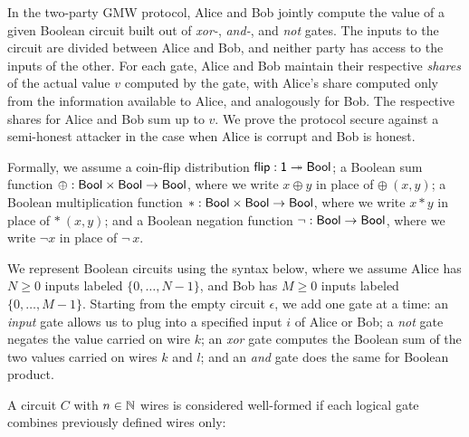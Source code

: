 In the two-party GMW protocol, Alice and Bob jointly compute the value of a given Boolean circuit built out of \emph{xor-}, \emph{and-}, and \emph{not} gates. The inputs to the circuit are divided between Alice and Bob, and neither party has access to the inputs of the other. For each gate, Alice and Bob maintain their respective \emph{shares} of the actual value $v$ computed by the gate, with Alice's share computed only from the information available to Alice, and analogously for Bob. The respective shares for Alice and Bob sum up to $v$. We prove the protocol secure against a semi-honest attacker in the case when Alice is corrupt and Bob is honest.

Formally, we assume a coin-flip distribution $\mathsf{flip} : \mathsf{1} \twoheadrightarrow \mathsf{Bool}$; a Boolean sum function $\oplus : \mathsf{Bool} \times \mathsf{Bool} \rightarrow \mathsf{Bool}$, where we write $x \oplus y$ in place of $\oplus \ (x,y)$; a Boolean multiplication function $* : \mathsf{Bool} \times \mathsf{Bool} \rightarrow \mathsf{Bool}$, where we write $x * y$ in place of $* \ (x,y)$; and a Boolean negation function $\neg : \mathsf{Bool} \rightarrow \mathsf{Bool}$, where we write $\neg x$ in place of $\neg \ x$.

We represent Boolean circuits using the syntax below, where we assume Alice has $N \geq 0$ inputs labeled $\{0,\ldots,N-1\}$, and Bob has $M \geq 0$ inputs labeled $\{0,\ldots,M-1\}$. Starting from the empty circuit $\epsilon$, we add one gate at a time: an \emph{input} gate allows us to plug into a specified input $i$ of Alice or Bob; a \emph{not} gate negates the value carried on wire $k$; an \emph{xor} gate computes the Boolean sum of the two values carried on wires $k$ and $l$; and an \emph{and} gate does the same for Boolean product.

\begin{syntax}
	
    \alternative{\epsilon}
\end{syntax}

\noindent A circuit $C$ with $n \in \mathbb{N}$ wires is considered well-formed if each logical gate combines previously defined wires only:


